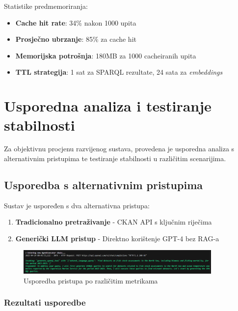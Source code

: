 Statistike predmemoriranja:
\begin{itemize}
    \item \textbf{Cache hit rate}: 34\% nakon 1000 upita
    \item \textbf{Prosječno ubrzanje}: 85\% za cache hit
    \item \textbf{Memorijska potrošnja}: 180MB za 1000 cacheiranih upita
    \item \textbf{TTL strategija}: 1 sat za SPARQL rezultate, 24 sata za \textit{embeddings}
\end{itemize}

\section{Usporedna analiza i testiranje stabilnosti}

Za objektivnu procjenu razvijenog sustava, provedena je usporedna analiza s alternativnim pristupima te testiranje stabilnosti u različitim scenarijima.

\subsection{Usporedba s alternativnim pristupima}

Sustav je uspoređen s dva alternativna pristupa:

\begin{enumerate}
    \item \textbf{Tradicionalno pretraživanje} - CKAN API s ključnim riječima
    \item \textbf{Generički LLM pristup} - Direktno korištenje GPT-4 bez RAG-a
\end{enumerate}

\begin{figure}[htbp]
    \centering
    \includegraphics[width=0.9\textwidth]{figures/izvjestaj_image_70.png}
    \caption{Usporedba pristupa po različitim metrikama}
    \label{fig:approach_comparison}
\end{figure}

\subsubsection{Rezultati usporedbe}

